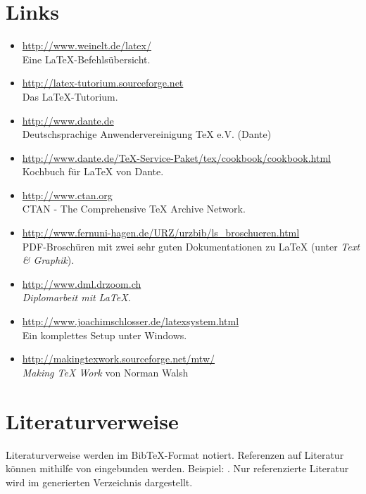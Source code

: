 \section{Links}
\label{ref:links}
\begin{itemize}
	\item \url{http://www.weinelt.de/latex/}\\
		Eine \LaTeX{}-Befehlsübersicht.
	\item \url{http://latex-tutorium.sourceforge.net}\\
		Das LaTeX-Tutorium.
	\item \url{http://www.dante.de}\\
		Deutschsprachige Anwendervereinigung TeX e.V. (Dante)
	\item \url{http://www.dante.de/TeX-Service-Paket/tex/cookbook/cookbook.html}\\
		Kochbuch für \LaTeX{} von Dante.
	\item \url{http://www.ctan.org}\\
		CTAN - The Comprehensive TeX Archive Network.
	\item \url{http://www.fernuni-hagen.de/URZ/urzbib/ls\_broschueren.html}\\
		PDF-Broschüren mit zwei sehr guten Dokumentationen zu \LaTeX{} (unter \textit{Text \& Graphik}).
	\item \url{http://www.dml.drzoom.ch}\\
		\textit{Diplomarbeit mit LaTeX.}
	\item \url{http://www.joachimschlosser.de/latexsystem.html}\\
		Ein komplettes Setup unter Windows.
	\item \url{http://makingtexwork.sourceforge.net/mtw/}\\
		\textit{Making TeX Work} von Norman Walsh 
\end{itemize}
\section{Literaturverweise}
Literaturverweise werden im BibTeX-Format notiert. Referenzen auf Literatur können mithilfe von  eingebunden werden. Beispiel: \cite{tanenbaum:2001}. Nur referenzierte Literatur wird im generierten Verzeichnis dargestellt.
